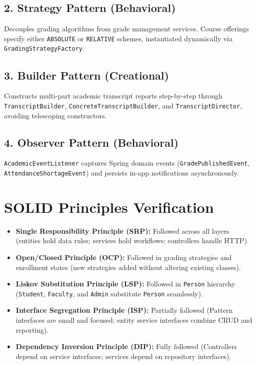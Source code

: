 \documentclass[12pt,a4paper,oneside]{report}
\begin{document}
\subsection{2. Strategy Pattern (Behavioral)}
Decouples grading algorithms from grade management services. Course offerings specify either \texttt{ABSOLUTE} or \texttt{RELATIVE} schemes, instantiated dynamically via \texttt{GradingStrategyFactory}.

\subsection{3. Builder Pattern (Creational)}
Constructs multi-part academic transcript reports step-by-step through \texttt{TranscriptBuilder}, \texttt{ConcreteTranscriptBuilder}, and \texttt{TranscriptDirector}, avoiding telescoping constructors.

\subsection{4. Observer Pattern (Behavioral)}
\texttt{AcademicEventListener} captures Spring domain events (\texttt{GradePublishedEvent}, \texttt{AttendanceShortageEvent}) and persists in-app notifications asynchronously.

\section{SOLID Principles Verification}
\begin{itemize}
    \item \textbf{Single Responsibility Principle (SRP):} Followed across all layers (entities hold data rules; services hold workflows; controllers handle HTTP).
    \item \textbf{Open/Closed Principle (OCP):} Followed in grading strategies and enrollment states (new strategies added without altering existing classes).
    \item \textbf{Liskov Substitution Principle (LSP):} Followed in \texttt{Person} hierarchy (\texttt{Student}, \texttt{Faculty}, and \texttt{Admin} substitute \texttt{Person} seamlessly).
    \item \textbf{Interface Segregation Principle (ISP):} Partially followed (Pattern interfaces are small and focused; entity service interfaces combine CRUD and reporting).
    \item \textbf{Dependency Inversion Principle (DIP):} Fully followed (Controllers depend on service interfaces; services depend on repository interfaces).
\end{itemize}
\end{document}
